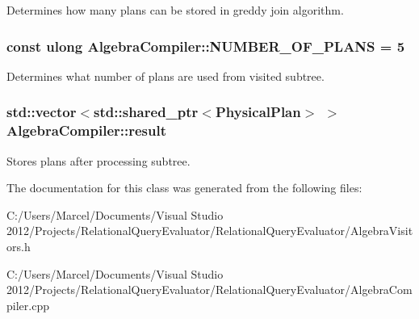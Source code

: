 Determines how many plans can be stored in greddy join algorithm. \hypertarget{class_algebra_compiler_ab1a348c2daa3ca8f805f7cec2b35e29d}{
\subsubsection[{N\+U\+M\+B\+E\+R\+\_\+\+O\+F\+\_\+\+P\+L\+A\+N\+S}]{\setlength{\rightskip}{0pt plus 5cm}const ulong Algebra\+Compiler\+::\+N\+U\+M\+B\+E\+R\+\_\+\+O\+F\+\_\+\+P\+L\+A\+N\+S = 5\hspace{0.3cm}{\ttfamily [static]}}}\label{class_algebra_compiler_ab1a348c2daa3ca8f805f7cec2b35e29d}
Determines what number of plans are used from visited subtree. \hypertarget{class_algebra_compiler_acf3202bd193e4552a1d4fadb6d0b356c}{
\subsubsection[{result}]{\setlength{\rightskip}{0pt plus 5cm}std\+::vector$<$std\+::shared\+\_\+ptr$<${\bf Physical\+Plan}$>$ $>$ Algebra\+Compiler\+::result}}\label{class_algebra_compiler_acf3202bd193e4552a1d4fadb6d0b356c}
Stores plans after processing subtree. 

The documentation for this class was generated from the following files\+:\begin{DoxyCompactItemize}
\item 
C\+:/\+Users/\+Marcel/\+Documents/\+Visual Studio 2012/\+Projects/\+Relational\+Query\+Evaluator/\+Relational\+Query\+Evaluator/Algebra\+Visitors.\+h\item 
C\+:/\+Users/\+Marcel/\+Documents/\+Visual Studio 2012/\+Projects/\+Relational\+Query\+Evaluator/\+Relational\+Query\+Evaluator/Algebra\+Compiler.\+cpp\end{DoxyCompactItemize}
